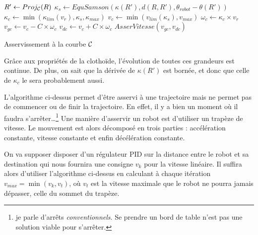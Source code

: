 \documentclass[11pt]{article}
\begin{document}
    \begin{algorithm}[ht]
        \DontPrintSemicolon
        \Loop{}
        {
        $R' \gets Proj_{\cal C}(R)$ 
        $\kappa_s \gets EquSamson(\kappa(R'), d(R, R'), \theta_{robot} - \theta(R'))$ 
        $\kappa_c \gets \min(\kappa_{lim}(v_r), \kappa_s, \kappa_{max})$ 
        $v_c \gets \min(v_{lim}(\kappa_s), v_{max})$ 
        $\omega_c \gets \kappa_c \times v_r$ 
        $v_{gc} \gets v_c - C \times \omega_c$ 
        $v_{dc} \gets v_c + C \times \omega_c$ 
        $AsserVitesse(v_{gc}, v_{dc})$ 
        }
        \caption{Asservissement à la courbe $\cal C$}
    \end{algorithm}

    Grâce aux propriétés de la clothoïde, l'évolution de toutes ces grandeurs est continue. De plus, on sait que la dérivée de $\kappa(R')$ est bornée, et donc que celle de $\kappa_c$ le sera probablement aussi.


    L'algorithme ci-dessus permet d'être asservi à une trajectoire mais ne permet pas de commencer ou de finir la trajectoire. En effet, il y a bien un moment où il faudra s'arrêter…\footnote{je parle d'arrêts \emph{conventionnels}. Se prendre un bord de table n'est pas une solution viable pour s'arrêter.} Une manière d'asservir un robot est d'utiliser un trapèze de vitesse. Le mouvement est alors décomposé en trois parties : accélération constante, vitesse constante et enfin décélération constante.

    On va supposer disposer d'un régulateur PID sur la distance entre le robot et sa destination qui nous fournira une consigne $v_k$ pour la vitesse linéaire. Il suffira alors d'utiliser l'algorithme ci-dessus en calculant à chaque itération $v_{max} = \min(v_k, v_t)$, où $v_t$ est la vitesse maximale que le robot ne pourra jamais dépasser, celle du sommet du trapèze.
\end{document}
